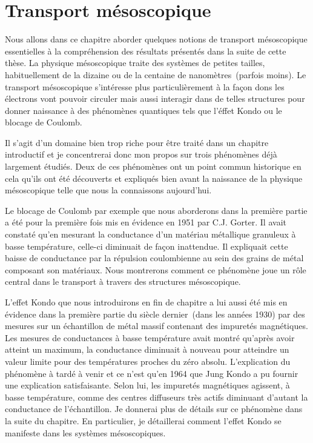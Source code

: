 


\chapter{Transport mésoscopique}

Nous allons dans ce chapitre aborder quelques notions de transport mésoscopique essentielles à la compréhension des résultats présentés dans la suite de cette thèse. La physique mésoscopique traite des systèmes de petites tailles, habituellement de la dizaine ou de la centaine de nanomètres~(parfois moins). Le transport mésoscopique s'intéresse plus particulièrement à la façon dons les électrons vont pouvoir circuler mais aussi interagir dans de telles structures pour donner naissance à des phénomènes quantiques tels que l'éffet Kondo ou le blocage de Coulomb. 

Il s'agit d'un domaine bien trop riche pour être traité dans un chapitre introductif et je concentrerai donc mon propos sur trois phénomènes déjà largement étudiés. Deux de ces phénomènes ont un point commun historique en cela qu'ils ont été découverts et expliqués bien avant la naissance de la physique mésoscopique telle que nous la connaissons aujourd'hui.

Le blocage de Coulomb par exemple que nous aborderons dans la première partie a été pour la première fois mis en évidence en 1951 par C.J. Gorter. Il avait constaté qu'en mesurant la conductance d'un matériau métallique granuleux à basse température, celle-ci diminuait de façon inattendue. Il expliquait cette baisse de conductance par la répulsion coulombienne au sein des grains de métal composant son matériaux. Nous montrerons comment ce phénomène joue un rôle central dans le transport à travers des structures mésoscopique.

L'effet Kondo que nous introduirons en fin de chapitre a lui aussi été mis en évidence dans la première partie du siècle dernier~(dans les années 1930) par des mesures sur un échantillon de métal massif contenant des impuretés magnétiques. Les mesures de conductances à basse température avait montré qu'après avoir atteint un maximum, la conductance diminuait à nouveau pour atteindre un valeur limite pour des températures proches du zéro absolu. L'explication du phénomène à tardé à venir et ce n'est qu'en 1964 que Jung Kondo a pu fournir une explication satisfaisante. Selon lui, les impuretés magnétiques agissent, à basse température, comme des centres diffuseurs très actifs diminuant d'autant la conductance de l'échantillon. Je donnerai plus de détails sur ce phénomène dans la suite du chapitre. En particulier, je détaillerai comment l'effet Kondo se manifeste dans les systèmes mésoscopiques.

